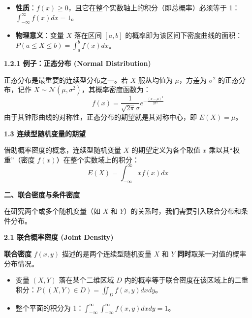 \documentclass[10pt]{article}
\numberwithin{equation}{section}
\theoremstyle{plain}
\theoremstyle{definition}
\theoremstyle{remark}
\begin{document}
\begin{RemarkBox}[性质与物理意义]
\begin{itemize}[leftmargin=*,nosep]
    \item \textbf{性质}：$f(x) \ge 0$，且它在整个实数轴上的积分（即总概率）必须等于 1：$\displaystyle \int_{-\infty}^{\infty} f(x) dx = 1$。
    \item \textbf{物理意义}：变量 $X$ 落在区间 $[a, b]$ 的概率即为该区间下密度曲线的面积：$\displaystyle P(a \le X \le b) = \int_{a}^{b} f(x) dx$。
\end{itemize}
\end{RemarkBox}

{\par\vspace{0.8ex}\noindent\normalsize\bfseries\color{secblue} 1.2.1 例子：正态分布 (Normal Distribution)\par}
正态分布是最重要的连续型分布之一。若 $X$ 服从均值为 $\mu$，方差为 $\sigma^2$ 的正态分布，记作 $X \sim \mathcal{N}(\mu, \sigma^2)$，其概率密度函数为：
\[ \displaystyle f(x) = \frac{1}{\sqrt{2\pi}\sigma} e^{-\frac{(x-\mu)^2}{2\sigma^2}} \]
由于其钟形曲线的对称性，正态分布的期望就是其对称中心，即 $E(X) = \mu$。

{\par\vspace{0.8ex}\noindent\normalsize\bfseries\color{accentD} 1.3 连续型随机变量的期望\par}
借助概率密度的概念，连续型随机变量 $X$ 的期望定义为各个取值 $x$ 乘以其“权重”（密度 $f(x)$）在整个实数域上的积分：
\[ \displaystyle E(X) = \int_{-\infty}^{\infty} x f(x) dx \]

{\par\vspace{1ex}\noindent\large\bfseries\color{brandD} 二、联合密度与条件密度\par}\par\vspace{0.5ex}
在研究两个或多个随机变量（如 $X$ 和 $Y$）的关系时，我们需要引入联合分布和条件分布。

{\par\vspace{0.8ex}\noindent\normalsize\bfseries\color{secblue} 2.1 联合概率密度 (Joint Density)\par}
\textbf{联合密度} $f(x, y)$ 描述的是两个连续型随机变量 $X$ 和 $Y$ \textbf{同时}取某一对值的概率分布情况。
\begin{itemize}[leftmargin=*,nosep]
    \item 变量 $(X, Y)$ 落在某个二维区域 $D$ 内的概率等于联合密度在该区域上的二重积分：$\displaystyle P((X,Y) \in D) = \iint_D f(x, y) dx dy$。
    \item 整个平面的积分为 1：$\displaystyle \int_{-\infty}^{\infty} \int_{-\infty}^{\infty} f(x, y) dx dy = 1$。
\end{itemize}
\end{document}

